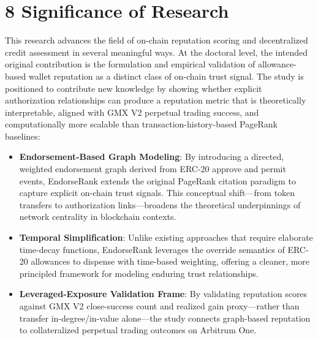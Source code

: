\clearpage
{}
\section*{8 \textbf{Significance of Research}}
\label{sec:significance-of-research}

This research advances the field of on-chain reputation scoring and decentralized credit assessment in several meaningful ways. At the doctoral level, the intended original contribution is the formulation and empirical validation of allowance-based wallet reputation as a distinct class of on-chain trust signal. The study is positioned to contribute new knowledge by showing whether explicit authorization relationships can produce a reputation metric that is theoretically interpretable, aligned with GMX V2 perpetual trading success, and computationally more scalable than transaction-history-based PageRank baselines:



\begin{itemize}
\item[\textbullet] \textbf{Endorsement-Based Graph Modeling}: By introducing a directed, weighted endorsement graph derived from ERC-20 approve and permit events, EndorseRank extends the original PageRank citation paradigm to capture explicit on-chain trust signals. This conceptual shift---from token transfers to authorization links---broadens the theoretical underpinnings of network centrality in blockchain contexts.
\item[\textbullet] \textbf{Temporal Simplification}: Unlike existing approaches that require elaborate time-decay functions, EndorseRank leverages the override semantics of ERC-20 allowances to dispense with time-based weighting, offering a cleaner, more principled framework for modeling enduring trust relationships.
\item[\textbullet] \textbf{Leveraged-Exposure Validation Frame}: By validating reputation scores against GMX V2 close-success count and realized gain proxy---rather than transfer in-degree/in-value alone---the study connects graph-based reputation to collateralized perpetual trading outcomes on Arbitrum One.
\end{itemize}

